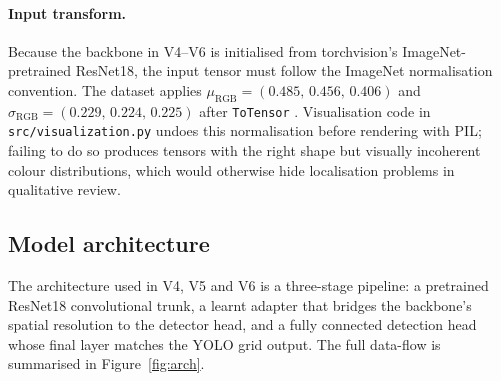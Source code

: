 \paragraph{Input transform.} Because the backbone in V4--V6 is initialised
from torchvision's ImageNet-pretrained ResNet18, the input tensor must follow
the ImageNet normalisation convention. The dataset applies
$\mu_{\text{RGB}} = (0.485,\,0.456,\,0.406)$ and
$\sigma_{\text{RGB}} = (0.229,\,0.224,\,0.225)$ after \texttt{ToTensor}
\citep{krizhevsky2012imagenet,russakovsky2015imagenet}. Visualisation code in
\texttt{src/visualization.py} undoes this normalisation before rendering with
PIL; failing to do so produces tensors with the right shape but visually
incoherent colour distributions, which would otherwise hide localisation
problems in qualitative review.

\subsection{Model architecture}
\label{sec:impl:model}

The architecture used in V4, V5 and V6 is a three-stage pipeline: a
pretrained ResNet18 convolutional trunk, a learnt adapter that bridges the
backbone's spatial resolution to the detector head, and a fully connected
detection head whose final layer matches the YOLO grid output. The full
data-flow is summarised in Figure~\ref{fig:arch}.

